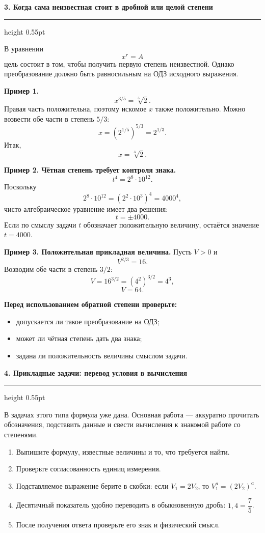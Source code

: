 \documentclass[a4paper,12pt]{article}
\newcommand{\keyidea}[1]{\textbf{\color{darkaccent}#1}}
\newcommand{\lessonsection}[1]{%
  \vspace{0.35em}%
  {\Large\bfseries\color{darkaccent}#1\par}%
  \vspace{0.22em}%
  {\color{accent!55}\hrule height 0.55pt}%
  \vspace{0.6em}%
}
\begin{document}

\lessonsection{3. Когда сама неизвестная стоит в дробной или целой степени}

В уравнении
\[
x^r=A
\]
цель состоит в том, чтобы получить первую степень неизвестной. Однако преобразование должно быть равносильным на ОДЗ исходного выражения.

\textbf{Пример 1.}
\[
x^{3/5}=\sqrt[5]{2}.
\]
Правая часть положительна, поэтому искомое $x$ также положительно. Можно возвести обе части в степень $5/3$:
\[
x=\left(2^{1/5}\right)^{5/3}
=2^{1/3}.
\]
Итак,
\[
\boxed{x=\sqrt[3]{2}}.
\]

\textbf{Пример 2. Чётная степень требует контроля знака.}
\[
t^4=2^8\cdot10^{12}.
\]
Поскольку
\[
2^8\cdot10^{12}
=\left(2^2\cdot10^3\right)^4
=4000^4,
\]
чисто алгебраическое уравнение имеет два решения:
\[
\boxed{t=\pm4000}.
\]
Если по смыслу задачи $t$ обозначает положительную величину, остаётся значение $t=4000$.

\textbf{Пример 3. Положительная прикладная величина.}
Пусть $V>0$ и
\[
V^{2/3}=16.
\]
Возводим обе части в степень $3/2$:
\[
V=16^{3/2}=(4^2)^{3/2}=4^3,
\]
\[
\boxed{V=64}.
\]

\keyidea{Перед использованием обратной степени проверьте:}
\begin{itemize}
  \item допускается ли такое преобразование на ОДЗ;
  \item может ли чётная степень дать два знака;
  \item задана ли положительность величины смыслом задачи.
\end{itemize}


\lessonsection{4. Прикладные задачи: перевод условия в вычисления}

В задачах этого типа формула уже дана. Основная работа --- аккуратно прочитать обозначения, подставить данные и свести вычисления к знакомой работе со степенями.

\begin{enumerate}
  \item Выпишите формулу, известные величины и то, что требуется найти.
  \item Проверьте согласованность единиц измерения.
  \item Подставляемое выражение берите в скобки: если $V_1=2V_2$, то $V_1^a=(2V_2)^a$.
  \item Десятичный показатель удобно переводить в обыкновенную дробь: $1{,}4=\dfrac75$.
  \item После получения ответа проверьте его знак и физический смысл.
\end{enumerate}
\end{document}
